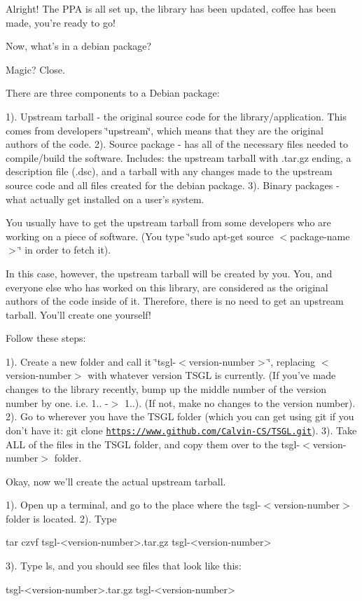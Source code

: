 Alright! The P\-P\-A is all set up, the library has been updated, coffee has been made, you're ready to go!

Now, what's in a debian package?

Magic? Close.

There are three components to a Debian package\-:

1). Upstream tarball -\/ the original source code for the library/application. This comes from developers \char`\"{}upstream\char`\"{}, which means that they are the original authors of the code. 2). Source package -\/ has all of the necessary files needed to compile/build the software. Includes\-: the upstream tarball with .tar.\-gz ending, a description file (.dsc), and a tarball with any changes made to the upstream source code and all files created for the debian package. 3). Binary packages -\/ what actually get installed on a user's system.

You usually have to get the upstream tarball from some developers who are working on a piece of software. (You type \char`\"{}sudo apt-\/get source $<$package-\/name$>$\char`\"{} in order to fetch it).

In this case, however, the upstream tarball will be created by you. You, and everyone else who has worked on this library, are considered as the original authors of the code inside of it. Therefore, there is no need to get an upstream tarball. You'll create one yourself!

Follow these steps\-:

1). Create a new folder and call it \char`\"{}tsgl-\/$<$version-\/number$>$\char`\"{}, replacing $<$version-\/number$>$ with whatever version T\-S\-G\-L is currently. (If you've made changes to the library recently, bump up the middle number of the version number by one. i.\-e. 1.. -\/$>$ 1..). (If not, make no changes to the version number). 2). Go to wherever you have the T\-S\-G\-L folder (which you can get using git if you don't have it\-: git clone \href{https://www.github.com/Calvin-CS/TSGL.git}{\tt https\-://www.\-github.\-com/\-Calvin-\/\-C\-S/\-T\-S\-G\-L.\-git}). 3). Take A\-L\-L of the files in the T\-S\-G\-L folder, and copy them over to the tsgl-\/$<$version-\/number$>$ folder.

Okay, now we'll create the actual upstream tarball.

1). Open up a terminal, and go to the place where the tsgl-\/$<$version-\/number$>$ folder is located. 2). Type \begin{DoxyVerb}tar czvf tsgl-<version-number>.tar.gz tsgl-<version-number>
\end{DoxyVerb}
 3). Type ls, and you should see files that look like this\-: \begin{DoxyVerb}tsgl-<version-number>.tar.gz tsgl-<version-number> 
\end{DoxyVerb}


